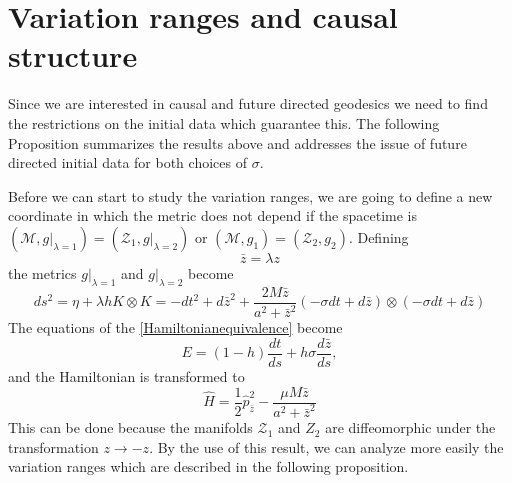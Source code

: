 \section{Variation ranges and causal structure}\label{causalstruct}
Since we are interested in causal and 
future
directed geodesics we need to find the restrictions on the initial data which 
guarantee this.
The following Proposition summarizes the results above and addresses the issue 
of future
directed initial data for both choices of $\sigma$.

Before we can start to study the variation ranges, we are going to define a new coordinate in which the metric does not depend if the spacetime is $(\mathcal{M},g|_{\lambda=1})=(\mathcal{Z}_1,g|_{\lambda=2})$ or  $(\mathcal{M},g_1)=(\mathcal{Z}_2,g_2)$. Defining 
\begin{equation}
 \bar{z}=\lambda z
\end{equation}
the metrics $g|_{\lambda=1}$ and $g|_{\lambda=2}$ become
 \begin{equation}\label{eq:KSmetricaxisnolam}
 ds^2=\eta + \lambda h K \otimes K =-dt^2+d{\bar z}^2+ \frac{2 M \bar z}{a^2+{\bar z}^2} (-\sigma dt + d \bar z) \otimes  (-\sigma dt + d \bar z)
\end{equation}
The equations of the \cref{Hamiltonianequivalence} become
 \begin{equation}
 E= \left (  1 -  h  \right ) \frac{d t}{ds}
+ h \sigma \frac{d {\bar z}}{ds},
 \end{equation}
 and the Hamiltonian is transformed to
 \begin{equation}
  \hat{H}=\frac{1}{2} \hat{p}_{\bar z}^2 -\frac{  \mu  M {\bar z}}{a^2+{\bar z}^2}
 \end{equation}
This can be done because the manifolds $\mathcal{Z}_1$ and $Z_2$ are diffeomorphic under the transformation $z \to -z$. By the use of this result, we can analyze more easily the variation ranges which are described in the following proposition.

